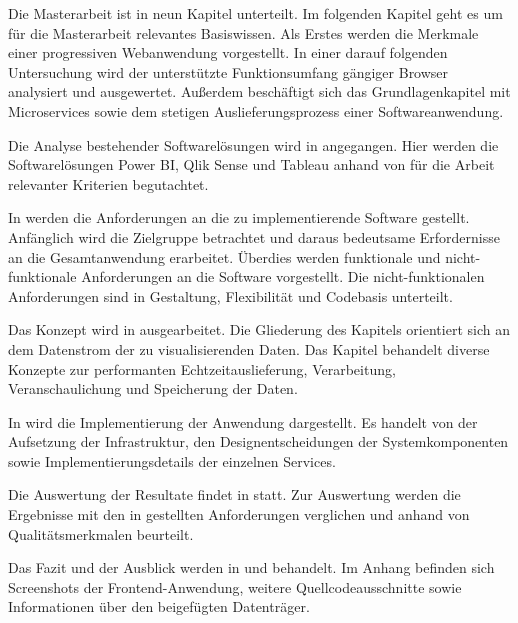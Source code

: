 Die Masterarbeit ist in neun Kapitel unterteilt. Im folgenden Kapitel geht es um für
die Masterarbeit relevantes Basiswissen. Als Erstes werden die Merkmale einer progressiven
Webanwendung vorgestellt. In einer darauf folgenden Untersuchung wird der
unterstützte Funktionsumfang gängiger Browser analysiert und ausgewertet.
Außerdem beschäftigt sich das Grundlagenkapitel mit Microservices
sowie dem stetigen Auslieferungsprozess einer Softwareanwendung.

Die Analyse bestehender Softwarelösungen wird in 
angegangen. Hier werden die Softwarelösungen Power BI, Qlik Sense und Tableau anhand von für
die Arbeit relevanter Kriterien begutachtet.

In  werden die Anforderungen an die zu implementierende Software
gestellt. Anfänglich wird die Zielgruppe betrachtet und daraus bedeutsame Erfordernisse
an die Gesamtanwendung erarbeitet. Überdies werden funktionale und nicht-funktionale Anforderungen
an die Software vorgestellt. Die nicht-funktionalen Anforderungen sind in 
Gestaltung, Flexibilität und Codebasis unterteilt.

Das Konzept wird in  ausgearbeitet. Die Gliederung des Kapitels
orientiert sich an dem Datenstrom der zu visualisierenden Daten. Das Kapitel behandelt
diverse Konzepte zur performanten Echtzeitauslieferung, Verarbeitung, Veranschaulichung
und Speicherung der Daten.

In  wird die Implementierung der Anwendung dargestellt. Es
handelt von der Aufsetzung der Infrastruktur, den Designentscheidungen der
Systemkomponenten sowie Implementierungsdetails der einzelnen Services.

Die Auswertung der Resultate findet in  statt. Zur Auswertung werden
die Ergebnisse mit den in  gestellten Anforderungen verglichen
und anhand von Qualitätsmerkmalen beurteilt.

Das Fazit und der Ausblick werden in  und  behandelt. Im Anhang befinden
sich Screenshots der Frontend-Anwendung, weitere Quellcodeausschnitte sowie Informationen
über den beigefügten Datenträger.
